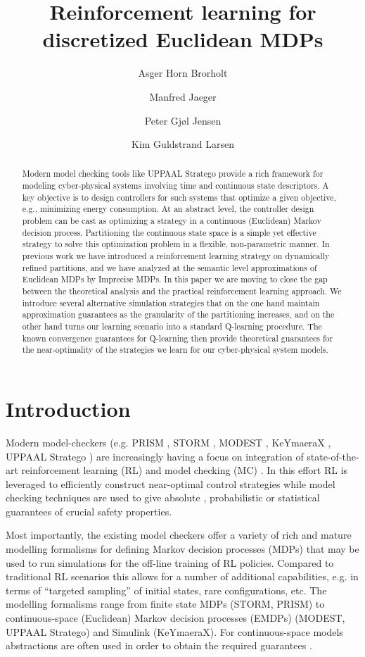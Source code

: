 \documentclass{llncs}
\title{Reinforcement learning for discretized Euclidean MDPs}
\author{Asger Horn Brorholt
\and Manfred Jaeger
\and Peter Gj{\o}l Jensen
\and Kim Guldstrand Larsen
}
\institute{Department of Computer Science, Aalborg University, Denmark }
\begin{document}
\maketitle

\begin{abstract}
  Modern model checking tools like UPPAAL Stratego provide a rich framework for
modeling cyber-physical systems involving time and continuous state descriptors. A key
objective is to design controllers for such systems that optimize a given objective, e.g.,
minimizing energy consumption. At an abstract level, the controller design problem can be
cast as optimizing a strategy in a continuous (Euclidean) Markov decision process.
Partitioning the continuous state space is a simple yet effective strategy to solve
this optimization problem in a flexible, non-parametric manner. In previous work we have
introduced a reinforcement learning strategy on dynamically refined partitions, and
we have analyzed at the semantic level approximations of Euclidean MDPs by Imprecise
MDPs. In this paper we are moving to close the gap between the theoretical analysis and the
practical reinforcement learning approach. We introduce several alternative simulation strategies
that on the one hand maintain approximation guarantees as the granularity of the partitioning
increases, and on the other hand turns our learning scenario into a standard Q-learning
procedure. The known convergence guarantees for Q-learning then provide theoretical guarantees
for the near-optimality of the strategies we learn for our cyber-physical system models.
\end{abstract}



\section{Introduction}


Modern model-checkers (e.g. PRISM \cite{Prism}, STORM \cite{Storm,COOLMC}, MODEST \cite{Modest}, KeYmaeraX \cite{ KeYmaera}, UPPAAL Stratego \cite{UPPAAL,TACAS15}) are increasingly having a focus on integration of state-of-the-art reinforcement learning (RL) and model checking (MC) \cite{Kim2}.  In this effort RL is leveraged to efficiently construct near-optimal control strategies while model checking techniques are used to give absolute \cite{ATVA14}, probabilistic \cite{Kim1, Kim3} or statistical guarantees \cite{FORTE20} of crucial safety properties.

Most importantly, the existing model checkers offer a variety of rich and mature modelling formalisms for defining Markov decision processes (MDPs) that may be used to run simulations for the off-line training of RL policies. Compared to traditional RL scenarios this allows for a number of  additional capabilities, e.g. in terms of “targeted sampling” of initial states, rare configurations, etc.   The modelling formalisms range from finite state MDPs (STORM, PRISM) to continuous-space (Euclidean) Markov decision processes (EMDPs)  (MODEST, UPPAAL Stratego) and Simulink (KeYmaeraX).  For continuous-space models  abstractions are often used in order to obtain the required guarantees \cite{ HerberAL21, ATVA14}.
\end{document}
